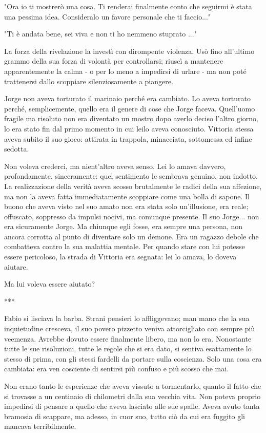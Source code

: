 "Ora io ti mostrerò una cosa. Ti renderai finalmente conto che seguirmi è stata una pessima idea. Consideralo un favore personale che ti faccio..."

"Ti è andata bene, sei viva e non ti ho nemmeno stuprato ..."

La forza della rivelazione la investì con dirompente violenza. Usò fino all'ultimo grammo della sua forza di volontà per controllarsi; riuscì a mantenere apparentemente la calma - o per lo meno a impedirsi di urlare - ma non poté trattenersi dallo scoppiare silenziosamente a piangere.

Jorge non aveva torturato il marinaio perché era cambiato. Lo aveva torturato perché, semplicemente, quello era il genere di cose che Jorge faceva. Quell'uomo fragile ma risoluto non era diventato un mostro dopo averlo deciso l'altro giorno, lo era stato fin dal primo momento in cui leilo aveva conosciuto. Vittoria stessa aveva subito il suo gioco: attirata in trappola, minacciata, sottomessa ed infine sedotta.

Non voleva crederci, ma nient'altro aveva senso. Lei lo amava davvero, profondamente, sinceramente: quel sentimento le sembrava genuino, non indotto. La realizzazione della verità aveva scosso brutalmente le radici della sua affezione, ma non la aveva fatta immediatamente scoppiare come una bolla di sapone. Il buono che aveva visto nel suo amato non era stata solo un'illusione, era reale; offuscato, soppresso da impulsi nocivi, ma comunque presente. Il suo Jorge... non era sicuramente Jorge. Ma chiunque egli fosse, era sempre una persona, non ancora corrotta al punto di diventare solo un demone. Era un ragazzo debole che combatteva contro la sua malattia mentale. Per quando stare con lui potesse essere pericoloso, la strada di Vittoria era segnata: lei lo amava, lo doveva aiutare.

Ma lui voleva essere aiutato?

***

Fabio si lisciava la barba. Strani pensieri lo affliggevano; man mano che la sua inquietudine cresceva, il suo povero pizzetto veniva attorcigliato con sempre più veemenza. Avrebbe dovuto essere finalmente libero, ma non lo era. Nonostante tutte le sue risoluzioni, tutte le regole che si era dato, si sentiva esattamente lo stesso di prima, con gli stessi fardelli da portare sulla coscienza. Solo una cosa era cambiata: era ven cosciente di sentirsi più confuso e più scosso che mai.

Non erano tanto le esperienze che aveva vissuto a tormentarlo, quanto il fatto che si trovasse a un centinaio di chilometri dalla sua vecchia vita. Non poteva proprio impedirsi di pensare a quello che aveva lasciato alle sue spalle. Aveva avuto tanta bramosia di scappare, ma adesso, in cuor suo, tutto ciò da cui era fuggito gli mancava terribilmente.

